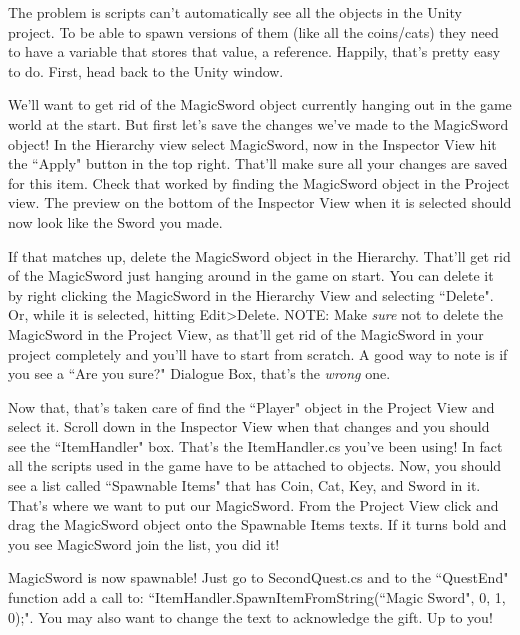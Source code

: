\documentclass{article}
\begin{document}
The problem is scripts can't automatically see all the objects in the Unity project. To be able to spawn versions of them (like all the coins/cats) they need to have a variable that stores that value, a reference. Happily, that's pretty easy to do. First, head back to the Unity window. 

We'll want to get rid of the MagicSword object currently hanging out in the game world at the start. But first let's save the changes we've made to the MagicSword object! In the Hierarchy view select MagicSword, now in the Inspector View hit the ``Apply" button in the top right. That'll make sure all your changes are saved for this item. Check that worked by finding the MagicSword object in the Project view. The preview on the bottom of the Inspector View when it is selected should now look like the Sword you made. 

If that matches up, delete the MagicSword object in the Hierarchy. That'll get rid of the MagicSword just hanging around in the game on start. You can delete it by right clicking the MagicSword in the Hierarchy View and selecting ``Delete". Or, while it is selected, hitting Edit>Delete. NOTE: Make \textit{sure} not to delete the MagicSword in the Project View, as that'll get rid of the MagicSword in your project completely and you'll have to start from scratch. A good way to note is if you see a ``Are you sure?" Dialogue Box, that's the \textit{wrong} one.

\noindent{}

Now that, that's taken care of find the ``Player" object in the Project View and select it. Scroll down in the Inspector View when that changes and you should see the ``ItemHandler" box. That's the ItemHandler.cs you've been using! In fact all the scripts used in the game have to be attached to objects. Now, you should see a list called ``Spawnable Items" that has Coin, Cat, Key, and Sword in it. That's where we want to put our MagicSword. From the Project View click and drag the MagicSword object onto the Spawnable Items texts. If it turns bold and you see MagicSword join the list, you did it! 

MagicSword is now spawnable! Just go to SecondQuest.cs and to the ``QuestEnd" function add a call to: ``ItemHandler.SpawnItemFromString(``Magic Sword", 0, 1, 0);". You may also want to change the text to acknowledge the gift. Up to you!
\end{document}
